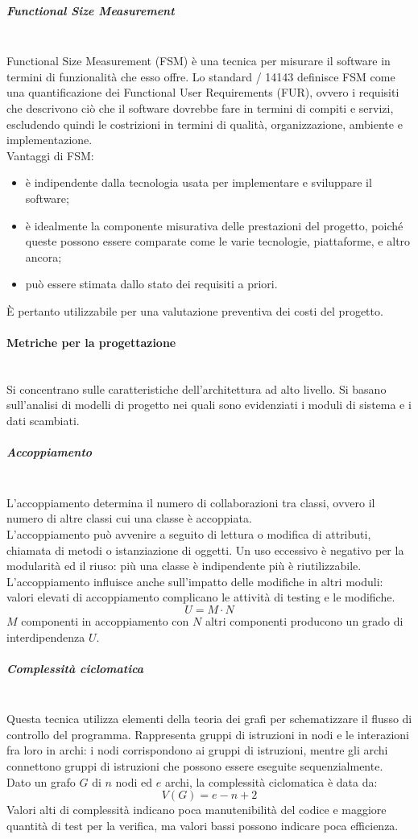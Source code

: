 \subparagraph{Functional Size Measurement}\mbox{}\\
Functional Size Measurement (FSM) è una tecnica per misurare il software in termini di funzionalità che esso offre. Lo standard / 14143 definisce FSM come una quantificazione dei Functional User Requirements (FUR), ovvero i requisiti che descrivono ciò che il software dovrebbe fare in termini di compiti e servizi, escludendo quindi le costrizioni in termini di qualità, organizzazione, ambiente e implementazione.\\
Vantaggi di FSM:
\begin{itemize}
	\item è indipendente dalla tecnologia usata per implementare e sviluppare il software;
	\item è idealmente la componente misurativa delle prestazioni del progetto, poiché queste possono essere comparate come le varie tecnologie, piattaforme, e altro ancora;
	\item può essere stimata dallo stato dei requisiti a priori.
\end{itemize}
\`{E} pertanto utilizzabile per una valutazione preventiva dei costi del progetto.

\paragraph{Metriche per la progettazione}\mbox{}\\
Si concentrano sulle caratteristiche dell'architettura ad alto livello. Si basano sull'analisi di modelli di progetto nei quali sono evidenziati i moduli di sistema e i dati scambiati.

\subparagraph{Accoppiamento}\mbox{}\\
L'accoppiamento determina il numero di collaborazioni tra classi, ovvero il numero di altre classi cui una classe è accoppiata.\\
L'accoppiamento può avvenire a seguito di lettura o modifica di attributi, chiamata di metodi o istanziazione di oggetti. Un uso eccessivo è negativo per la modularità ed il riuso: più una classe è indipendente più è riutilizzabile. L'accoppiamento influisce anche sull'impatto delle modifiche in altri moduli: valori elevati di accoppiamento complicano le attività di testing e le modifiche.
\[ U = M \cdot N \]
$M$ componenti in accoppiamento con $N$ altri componenti producono un grado di interdipendenza $U$.

\subparagraph{Complessità ciclomatica}\mbox{}\\
Questa tecnica utilizza elementi della teoria dei grafi per schematizzare il flusso di controllo del programma. Rappresenta gruppi di istruzioni in nodi e le interazioni fra loro in archi: i nodi corrispondono ai gruppi di istruzioni, mentre gli archi connettono gruppi di istruzioni che possono essere eseguite sequenzialmente.\\
Dato un grafo $G$ di $n$ nodi ed $e$ archi, la complessità ciclomatica è data da:
\[ V\left(G\right) = e - n + 2 \]
Valori alti di complessità indicano poca manutenibilità del codice e maggiore quantità di test per la verifica, ma valori bassi possono indicare poca efficienza.

